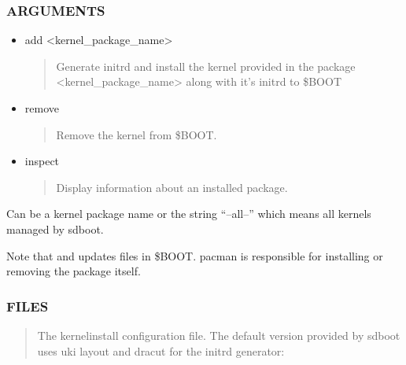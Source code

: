 \documentclass[letterpaper,11pt,english]{sphinxmanual}
\begin{document}
\subsubsection{ARGUMENTS}
\label{\detokenize{_build/man-ready/sd-boot-kernel-update.8:arguments}}
\sphinxAtStartPar
{}
\begin{itemize}
\item {} 
\sphinxAtStartPar
add <kernel\_package\_name>
\begin{quote}

\sphinxAtStartPar
Generate initrd and install the kernel provided in the package <kernel\_package\_name>
along with it’s initrd to \$BOOT
\end{quote}

\item {} 
\sphinxAtStartPar
remove
\begin{quote}

\sphinxAtStartPar
Remove the kernel from \$BOOT.
\end{quote}

\item {} 
\sphinxAtStartPar
inspect
\begin{quote}

\sphinxAtStartPar
Display information about an installed package.
\end{quote}

\end{itemize}

\sphinxAtStartPar
{}

\sphinxAtStartPar
Can be a kernel package name or the string “–all–” which means all kernels managed by sd\sphinxhyphen{}boot.

\sphinxAtStartPar
Note that  and  updates files in \$BOOT. pacman is responsible for installing or removing the
package itself.


\subsubsection{FILES}
\label{\detokenize{_build/man-ready/sd-boot-kernel-update.8:files}}
\sphinxAtStartPar
{}
\begin{quote}

\sphinxAtStartPar
The kernel\sphinxhyphen{}install configuration file. The default version provided by sd\sphinxhyphen{}boot uses
uki layout and dracut for the initrd generator:
\end{quote}
\end{document}
